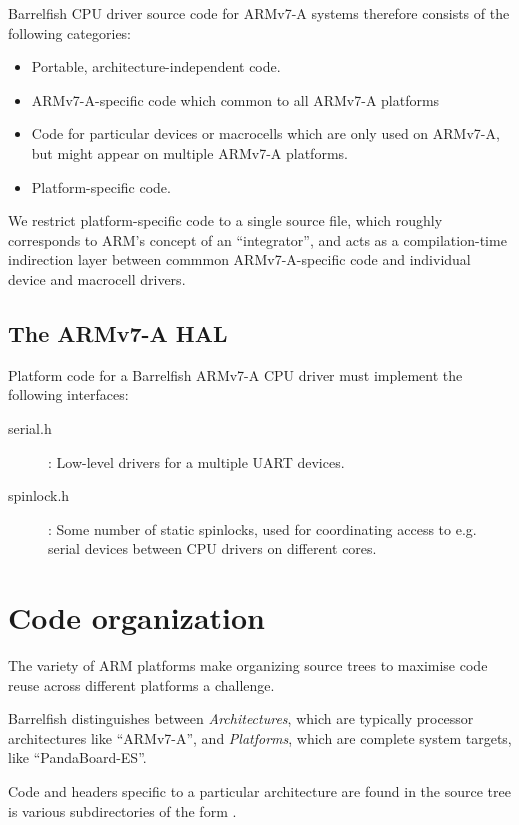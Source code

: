 \documentclass[a4paper,twoside]{report} %
\begin{document}
Barrelfish CPU driver source code for ARMv7-A systems therefore
consists of the following categories:
\begin{itemize}
\item Portable, architecture-independent code.
\item ARMv7-A-specific code which common to all ARMv7-A platforms
\item Code for particular devices or macrocells which are only used on
  ARMv7-A, but might appear on multiple ARMv7-A platforms.
\item Platform-specific code. 
\end{itemize}

We restrict platform-specific code to a single source file, which
roughly corresponds to ARM's concept of an ``integrator'', and acts as
a compilation-time indirection layer between commmon ARMv7-A-specific
code and individual device and macrocell drivers.  

\section{The ARMv7-A HAL}

Platform code for a Barrelfish ARMv7-A CPU driver must implement the
following interfaces:

\begin{description}
\item[serial.h]: Low-level drivers for a multiple UART devices.
\item[spinlock.h]: Some number of static spinlocks, used for
  coordinating access to e.g. serial devices between CPU drivers on
  different cores. 
\end{description}



\chapter{Code organization}

The variety of ARM platforms make organizing source trees to maximise
code reuse across different platforms a challenge. 

Barrelfish distinguishes between \emph{Architectures}, which are
typically processor architectures like ``ARMv7-A'', and \emph{Platforms},
which are complete system targets, like ``PandaBoard-ES''. 

Code and headers specific to a particular architecture are found in
the source tree is various subdirectories of the form
.  
\end{document}
